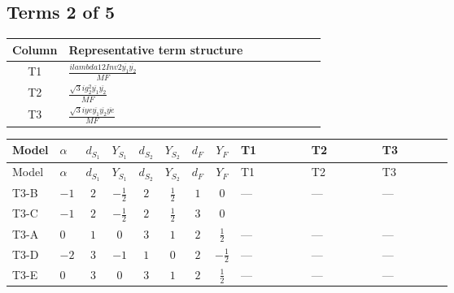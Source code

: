 \documentclass[8pt]{article}
\begin{document}
\begin{landscape}
\subsection*{Terms 2 of 5}
\begin{center}
\begin{tabular}{@{}c >{\raggedright\arraybackslash}p{0.82\linewidth}@{}}
\toprule
Column & Representative term structure \\
\midrule
T1 & \(\displaystyle \frac{i lambda12Inv2 \overline{y_{1}} \overline{y_{2}}}{MF}\) \\
\midrule
T2 & \(\displaystyle \frac{\sqrt{3} i g_{2}^{2} \overline{y_{1}} \overline{y_{2}}}{MF}\) \\
\midrule
T3 & \(\displaystyle \frac{\sqrt{3} i ye \overline{y_{1}} \overline{y_{2}} \overline{ye}}{MF}\) \\
\midrule
\bottomrule
\end{tabular}
\end{center}
\smallskip
\tiny
\begin{longtable}{@{}llcccccc >{\raggedright\arraybackslash}p{0.21\linewidth} >{\raggedright\arraybackslash}p{0.21\linewidth} >{\raggedright\arraybackslash}p{0.21\linewidth}@{}}
\toprule
Model & $\alpha$ & $d_{S_1}$ & $Y_{S_1}$ & $d_{S_2}$ & $Y_{S_2}$ & $d_F$ & $Y_F$ & T1 & T2 & T3 \\
\midrule
\endfirsthead
\toprule
Model & $\alpha$ & $d_{S_1}$ & $Y_{S_1}$ & $d_{S_2}$ & $Y_{S_2}$ & $d_F$ & $Y_F$ & T1 & T2 & T3 \\
\midrule
\endhead
T3-B & $-1$ & $2$ & $-\frac{1}{2}$ & $2$ & $\frac{1}{2}$ & $1$ & $0$ & --- & --- & --- \\
\midrule
T3-C & $-1$ & $2$ & $-\frac{1}{2}$ & $2$ & $\frac{1}{2}$ & $3$ & $0$ & \scriptsize\adjustbox{max width=\linewidth}{$\begin{gathered} \frac{2 i lambda12Inv2 \overline{y_{1}} \overline{y_{2}}}{3 MF}\end{gathered}$} & \scriptsize\adjustbox{max width=\linewidth}{$\begin{gathered} \frac{\sqrt{3} i g_{2}^{2} \overline{y_{1}} \overline{y_{2}}}{2 MF}\end{gathered}$} & \scriptsize\adjustbox{max width=\linewidth}{$\begin{gathered} - \frac{\sqrt{3} i ye \overline{y_{1}} \overline{y_{2}} \overline{ye}}{6 MF}\end{gathered}$} \\
\midrule
T3-A & $0$ & $1$ & $0$ & $3$ & $1$ & $2$ & $\frac{1}{2}$ & --- & --- & --- \\
\midrule
T3-D & $-2$ & $3$ & $-1$ & $1$ & $0$ & $2$ & $-\frac{1}{2}$ & --- & --- & --- \\
\midrule
T3-E & $0$ & $3$ & $0$ & $3$ & $1$ & $2$ & $\frac{1}{2}$ & --- & --- & --- \\
\midrule
\bottomrule
\end{longtable}
\clearpage

\end{landscape}
\end{document}
